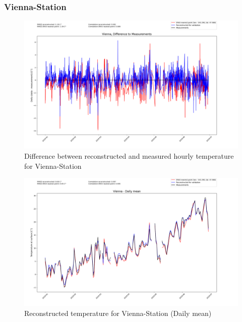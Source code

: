 \subsubsection*{Vienna-Station}

\begin{figure}[H]
    \centering
    \includegraphics[width=1.02\textwidth]{resources/images/charts/vienna_eval_grib_final/Vienna, Difference to Measurements.png}
    \caption{Difference between reconstructed and measured hourly temperature for Vienna-Station}
\end{figure}

\begin{figure}
    \centering
    \includegraphics[width=1.02\textwidth]{resources/images/charts/vienna_eval_grib_final/Vienna - Daily mean.png}
    \caption{Reconstructed temperature for Vienna-Station (Daily mean)}
\end{figure}

